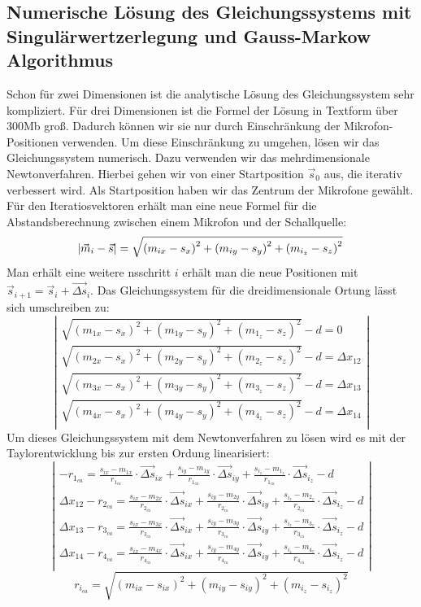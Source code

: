 \subsection{Numerische Lösung des Gleichungssystems mit Singulärwertzerlegung und Gauss-Markow Algorithmus}
Schon für zwei Dimensionen ist die analytische Lösung des Gleichungssystem sehr kompliziert. Für drei Dimensionen ist die Formel der Lösung in Textform über 300Mb groß. Dadurch können wir sie nur durch Einschränkung der Mikrofon-Positionen verwenden. Um diese Einschränkung zu umgehen, lösen wir das Gleichungssystem numerisch. Dazu verwenden wir das mehrdimensionale Newtonverfahren. Hierbei gehen wir von einer Startposition $\vec{s}_0$ aus, die iterativ verbessert wird. Als Startposition haben wir das Zentrum der Mikrofone gewählt. Für den Iteratiosvektoren erhält man eine neue Formel für die Abstandsberechnung zwischen einem Mikrofon und der Schallquelle:
$$\abs{\vec{m}_i - \vec{s}} = \sqrt{{(m_{ix} - s_x)}^2 + {(m_{iy} - s_y)}^2 + {(m_{i_z} - s_z)}^2}$$
Man erhält eine weitere nsschritt $i$ erhält man die neue Positionen mit $\vec{s}_{i + 1} = \vec{s}_i + \vec{\Delta{s}}_i$. Das Gleichungssystem für die dreidimensionale Ortung lässt sich umschreiben zu:
$$\left|\begin{array}{c}
\sqrt{(m_{1x} - s_x)^2 + (m_{1y} - s_y)^2 + (m_{1_z} - s_z)^2} - d = 0 \\
\sqrt{(m_{2x} - s_x)^2 + (m_{2y} - s_y)^2 + (m_{2_z} - s_z)^2} - d = \Delta{x_{12}} \\
\sqrt{(m_{3x} - s_x)^2 + (m_{3y} - s_y)^2 + (m_{3_z} - s_z)^2} - d = \Delta{x_{13}} \\
\sqrt{(m_{4x} - s_x)^2 + (m_{4y} - s_y)^2 + (m_{4_z} - s_z)^2} - d = \Delta{x_{14}} \\
\end{array}\right|$$
Um dieses Gleichungssystem mit dem Newtonverfahren zu lösen wird es mit der Taylorentwicklung bis zur ersten Ordung linearisiert:
$$\left|\begin{array}{c}
-r_{1_{ca}} = \frac{s_{ix} - m_{1x}}{r_{1_{ca}}} \cdot \vec{\Delta{s}}_{ix} + \frac{s_{iy} - m_{1y}}{r_{1_{ca}}} \cdot \vec{\Delta{s}}_{iy} + \frac{s_{i_z} - m_{1_z}}{r_{1_{ca}}} \cdot \vec{\Delta{s}}_{i_z} - d \\
\Delta{x_{12}} - r_{2_{ca}} = \frac{s_{ix} - m_{2x}}{r_{2_{ca}}} \cdot \vec{\Delta{s}}_{ix} + \frac{s_{iy} - m_{2y}}{r_{2_{ca}}} \cdot \vec{\Delta{s}}_{iy} + \frac{s_{i_z} - m_{2_z}}{r_{2_{ca}}} \cdot \vec{\Delta{s}}_{i_z} - d \\
\Delta{x_{13}} - r_{3_{ca}} = \frac{s_{ix} - m_{3x}}{r_{3_{ca}}} \cdot \vec{\Delta{s}}_{ix} + \frac{s_{iy} - m_{3y}}{r_{3_{ca}}} \cdot \vec{\Delta{s}}_{iy} + \frac{s_{i_z} - m_{3_z}}{r_{3_{ca}}} \cdot \vec{\Delta{s}}_{i_z} - d \\
\Delta{x_{14}} - r_{4_{ca}} = \frac{s_{ix} - m_{4x}}{r_{4_{ca}}} \cdot \vec{\Delta{s}}_{ix} + \frac{s_{iy} - m_{4y}}{r_{4_{ca}}} \cdot \vec{\Delta{s}}_{iy} + \frac{s_{i_z} - m_{4_z}}{r_{4_{ca}}} \cdot \vec{\Delta{s}}_{i_z} - d \\
\end{array}\right|$$
$$r_{i_{ca}} = \sqrt{(m_{ix} - s_{ix})^2 + (m_{iy} - s_{iy})^2 + (m_{i_z} - s_{i_z})^2}$$


